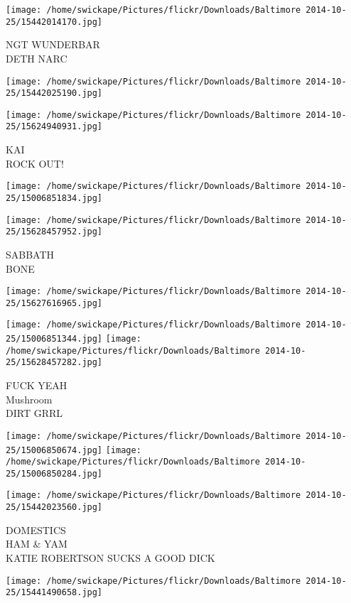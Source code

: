 \documentclass[10pt,letterpaper]{article}
\begin{document}
\vspace{0.25in}
\texttt{[image: /home/swickape/Pictures/flickr/Downloads/Baltimore 2014-10-25/15442014170.jpg]}

NGT WUNDERBAR\\
DETH NARC
\pagebreak

\texttt{[image: /home/swickape/Pictures/flickr/Downloads/Baltimore 2014-10-25/15442025190.jpg]}

\vspace{0.25in}
\texttt{[image: /home/swickape/Pictures/flickr/Downloads/Baltimore 2014-10-25/15624940931.jpg]}

KAI\\
ROCK OUT!
\pagebreak

\texttt{[image: /home/swickape/Pictures/flickr/Downloads/Baltimore 2014-10-25/15006851834.jpg]}

\vspace{0.25in}
\texttt{[image: /home/swickape/Pictures/flickr/Downloads/Baltimore 2014-10-25/15628457952.jpg]}

SABBATH\\
BONE
\pagebreak

\texttt{[image: /home/swickape/Pictures/flickr/Downloads/Baltimore 2014-10-25/15627616965.jpg]}

\vspace{0.25in}
\texttt{[image: /home/swickape/Pictures/flickr/Downloads/Baltimore 2014-10-25/15006851344.jpg]}
\texttt{[image: /home/swickape/Pictures/flickr/Downloads/Baltimore 2014-10-25/15628457282.jpg]}

FUCK YEAH\\
Mushroom\\
DIRT GRRL
\pagebreak

\texttt{[image: /home/swickape/Pictures/flickr/Downloads/Baltimore 2014-10-25/15006850674.jpg]}
\texttt{[image: /home/swickape/Pictures/flickr/Downloads/Baltimore 2014-10-25/15006850284.jpg]}

\vspace{0.25in}
\texttt{[image: /home/swickape/Pictures/flickr/Downloads/Baltimore 2014-10-25/15442023560.jpg]}

DOMESTICS\\
HAM \& YAM\\
KATIE ROBERTSON SUCKS A GOOD DICK
\pagebreak

\texttt{[image: /home/swickape/Pictures/flickr/Downloads/Baltimore 2014-10-25/15441490658.jpg]}
\end{document}
